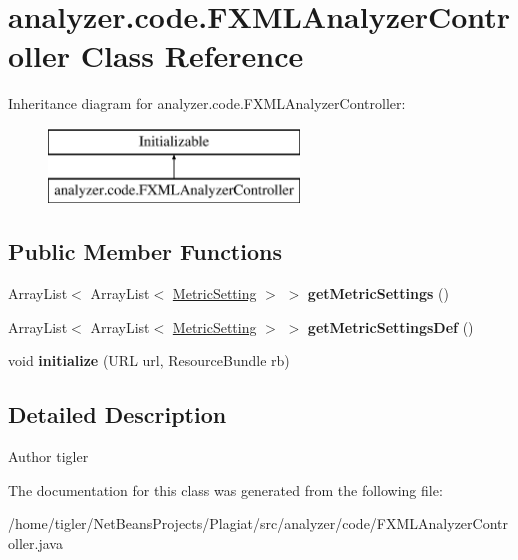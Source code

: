 \hypertarget{classanalyzer_1_1code_1_1FXMLAnalyzerController}{}\section{analyzer.\+code.\+F\+X\+M\+L\+Analyzer\+Controller Class Reference}
\label{classanalyzer_1_1code_1_1FXMLAnalyzerController}
Inheritance diagram for analyzer.\+code.\+F\+X\+M\+L\+Analyzer\+Controller\+:\begin{figure}[H]
\begin{center}
\leavevmode
\includegraphics[height=2.000000cm]{classanalyzer_1_1code_1_1FXMLAnalyzerController}
\end{center}
\end{figure}
\subsection*{Public Member Functions}
\begin{DoxyCompactItemize}
\item 
\mbox{\label{classanalyzer_1_1code_1_1FXMLAnalyzerController_a742d7b4fb9f500ccba85a7e6e60c8283}} 
Array\+List$<$ Array\+List$<$ \hyperlink{classanalyzer_1_1code_1_1MetricSetting}{Metric\+Setting} $>$ $>$ {\bfseries get\+Metric\+Settings} ()
\item 
\mbox{\label{classanalyzer_1_1code_1_1FXMLAnalyzerController_aaae0681946ade2af2356aa45c2ed202f}} 
Array\+List$<$ Array\+List$<$ \hyperlink{classanalyzer_1_1code_1_1MetricSetting}{Metric\+Setting} $>$ $>$ {\bfseries get\+Metric\+Settings\+Def} ()
\item 
\mbox{\label{classanalyzer_1_1code_1_1FXMLAnalyzerController_a2cd9499872c25effdb902574f2f484b7}} 
void {\bfseries initialize} (U\+RL url, Resource\+Bundle rb)
\end{DoxyCompactItemize}


\subsection{Detailed Description}
\begin{DoxyAuthor}{Author}
tigler 
\end{DoxyAuthor}


The documentation for this class was generated from the following file\+:\begin{DoxyCompactItemize}
\item 
/home/tigler/\+Net\+Beans\+Projects/\+Plagiat/src/analyzer/code/F\+X\+M\+L\+Analyzer\+Controller.\+java\end{DoxyCompactItemize}
